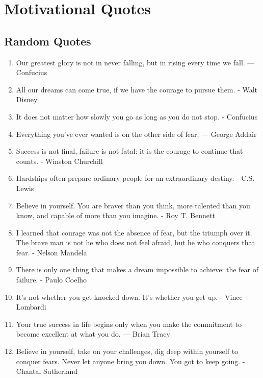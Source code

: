 
\chapter{Motivational Quotes}



    \section*{Random Quotes}
        \begin{enumerate}
            \item Our greatest glory is not in never falling, but in rising every time we fall. — Confucius
            \item All our dreams can come true, if we have the courage to pursue them. - Walt Disney
            \item It does not matter how slowly you go as long as you do not stop. - Confucius
            \item Everything you’ve ever wanted is on the other side of fear. — George Addair
            \item Success is not final, failure is not fatal: it is the courage to continue that counts. - Winston Churchill
            \item Hardships often prepare ordinary people for an extraordinary destiny. - C.S. Lewis
            \item Believe in yourself. You are braver than you think, more talented than you know, and capable of more than you imagine. - Roy T. Bennett
            \item I learned that courage was not the absence of fear, but the triumph over it. The brave man is not he who does not feel afraid, but he who conquers that fear. - Nelson Mandela
            \item There is only one thing that makes a dream impossible to achieve: the fear of failure. - Paulo Coelho
            \item It’s not whether you get knocked down. It’s whether you get up. - Vince Lombardi
            \item Your true success in life begins only when you make the commitment to become excellent at what you do. — Brian Tracy
            \item Believe in yourself, take on your challenges, dig deep within yourself to conquer fears. Never let anyone bring you down. You got to keep going. - Chantal Sutherland

\end{enumerate}
